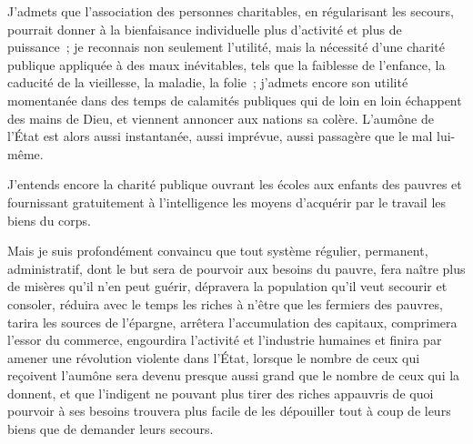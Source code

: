 \documentclass[french,twoside]{book} %
\newcommand{\astermono}{\medskip\centerline{\color{rubric}\large\selectfont{\syms ✻}}\medskip\par}%
\begin{document}
J'admets que l’association des personnes charitables, en régularisant les secours, pourrait donner à la bienfaisance individuelle plus d’activité et plus de puissance ; je reconnais non seulement l’utilité, mais la nécessité d’une charité publique appliquée à des maux inévitables, tels que la faiblesse de l’enfance, la caducité de la vieillesse, la maladie, la folie ; j’admets encore son utilité momentanée dans des temps de calamités publiques qui de loin en loin échappent des mains de Dieu, et viennent annoncer aux nations sa colère. L'aumône de l’État est alors aussi instantanée, aussi imprévue, aussi passagère que le mal lui-même.\par
J'entends encore la charité publique ouvrant les écoles aux enfants des pauvres et fournissant gratuitement à l’intelligence les moyens d’acquérir par le travail les biens du corps.\par
\bigbreak
\noindent Mais je suis profondément convaincu que tout système régulier, permanent, administratif, dont le but sera de pourvoir aux besoins du pauvre, fera naître plus de misères qu’il n’en peut guérir, dépravera la population qu’il veut secourir et consoler, réduira avec le temps les riches à n’être que les fermiers des pauvres, tarira les sources de l’épargne, arrêtera l’accumulation des capitaux, comprimera l’essor du commerce, engourdira l’activité et l’industrie humaines et finira par amener une révolution violente dans l’État, lorsque le nombre de ceux qui reçoivent l’aumône sera devenu presque aussi grand que le nombre de ceux qui la donnent, et que l’indigent ne pouvant plus tirer des riches appauvris de quoi pourvoir à ses besoins trouvera plus facile de les dépouiller tout à coup de leurs biens que de demander leurs secours.\par

\astermono
\end{document}
